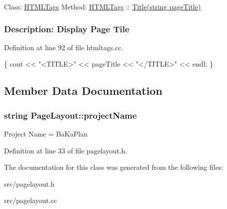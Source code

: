  Class\-: \hyperlink{classHTMLTags}{H\-T\-M\-L\-Tags} Method\-: \hyperlink{classHTMLTags}{H\-T\-M\-L\-Tags} \-:\-: \hyperlink{classHTMLTags_a5128d6f1c6be5ac1689047fc9d0d159f_a5128d6f1c6be5ac1689047fc9d0d159f}{Title(string page\-Title)} \subsubsection*{Description\-: Display Page Tile}

Definition at line 92 of file htmltags.\-cc.


\begin{DoxyCode}
\{
    cout << \textcolor{stringliteral}{"<TITLE>"} << pageTitle << \textcolor{stringliteral}{"</TITLE>"} << endl;
\}
\end{DoxyCode}


\subsection{Member Data Documentation}
\hypertarget{classPageLayout_a8a3c1ddc422df2556fbc95d0cd575a05_a8a3c1ddc422df2556fbc95d0cd575a05}{
\subsubsection[{project\-Name}]{\setlength{\rightskip}{0pt plus 5cm}string Page\-Layout\-::project\-Name\hspace{0.3cm}{\ttfamily [protected]}}}\label{d7/d9e/classPageLayout_a8a3c1ddc422df2556fbc95d0cd575a05_a8a3c1ddc422df2556fbc95d0cd575a05}
Project Name = Ba\-Ka\-Plan 

Definition at line 33 of file pagelayout.\-h.



The documentation for this class was generated from the following files\-:\begin{DoxyCompactItemize}
\item 
src/pagelayout.\-h\item 
src/pagelayout.\-cc\end{DoxyCompactItemize}
